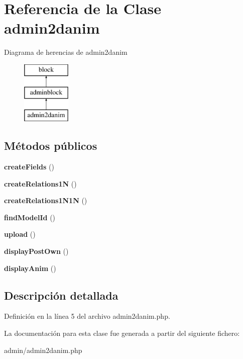 \hypertarget{classadmin2danim}{\section{\-Referencia de la \-Clase admin2danim}
\label{classadmin2danim}
}
\-Diagrama de herencias de admin2danim\begin{figure}[H]
\begin{center}
\leavevmode
\includegraphics[height=3.000000cm]{classadmin2danim}
\end{center}
\end{figure}
\subsection*{\-Métodos públicos}
\begin{DoxyCompactItemize}
\item 
\hypertarget{classadmin2danim_a236816c06411884f994a70c97c8f3a71}{{\bfseries create\-Fields} ()}\label{classadmin2danim_a236816c06411884f994a70c97c8f3a71}

\item 
\hypertarget{classadmin2danim_a3abf1a2202ba64cd5148c8ce93aa60b3}{{\bfseries create\-Relations1\-N} ()}\label{classadmin2danim_a3abf1a2202ba64cd5148c8ce93aa60b3}

\item 
\hypertarget{classadmin2danim_aed4665b024fe1b09404d2ad47444f4cf}{{\bfseries create\-Relations1\-N1\-N} ()}\label{classadmin2danim_aed4665b024fe1b09404d2ad47444f4cf}

\item 
\hypertarget{classadmin2danim_af8b70fda0c451907be1ddabaf757cd92}{{\bfseries find\-Model\-Id} ()}\label{classadmin2danim_af8b70fda0c451907be1ddabaf757cd92}

\item 
\hypertarget{classadmin2danim_a047496fc7a4c63d403f2a9aeba9bb0cc}{{\bfseries upload} ()}\label{classadmin2danim_a047496fc7a4c63d403f2a9aeba9bb0cc}

\item 
\hypertarget{classadmin2danim_a950abe5065035087fa8e9c7478a90482}{{\bfseries display\-Post\-Own} ()}\label{classadmin2danim_a950abe5065035087fa8e9c7478a90482}

\item 
\hypertarget{classadmin2danim_a04b458e682b3a76d062bc3b686fe4a08}{{\bfseries display\-Anim} ()}\label{classadmin2danim_a04b458e682b3a76d062bc3b686fe4a08}

\end{DoxyCompactItemize}


\subsection{\-Descripción detallada}


\-Definición en la línea 5 del archivo admin2danim.\-php.



\-La documentación para esta clase fue generada a partir del siguiente fichero\-:\begin{DoxyCompactItemize}
\item 
admin/admin2danim.\-php\end{DoxyCompactItemize}
